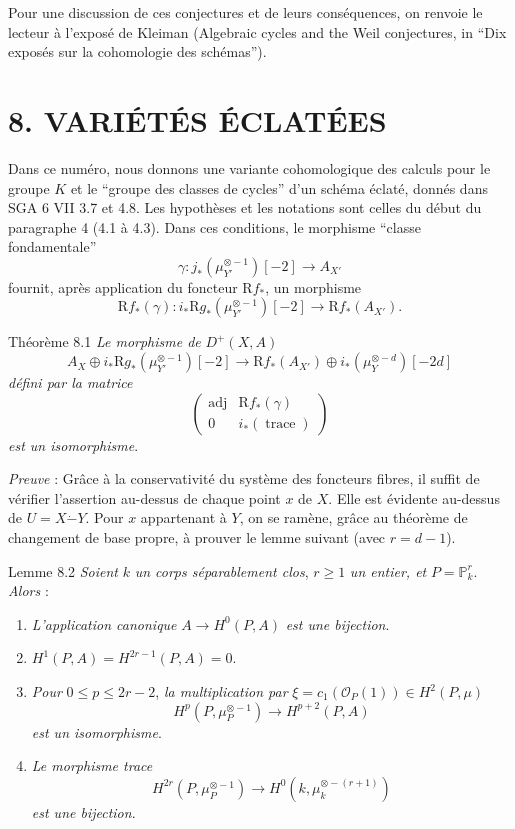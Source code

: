 Pour une discussion de ces conjectures et de leurs conséquences, on renvoie le lecteur à l'exposé de Kleiman (Algebraic cycles and the Weil conjectures, in ``Dix exposés sur la cohomologie des schémas'').

\section*{8. VARIÉTÉS ÉCLATÉES}

Dans ce numéro, nous donnons une variante cohomologique des calculs pour le groupe $K$ et le ``groupe des classes de cycles'' d'un schéma éclaté, donnés dans SGA 6 VII 3.7 et 4.8. Les hypothèses et les notations sont celles du début du paragraphe 4 (4.1 à 4.3). Dans ces conditions, le morphisme ``classe fondamentale''
\[
\gamma:j_*(\mu_{Y'}^{\otimes -1})[-2]\to A_{X'}
\]
fournit, après application du foncteur $\mathrm{R} f_*$, un morphisme
\[
\mathrm{R} f_*(\gamma):i_*\mathrm{R} g_*(\mu_{Y'}^{\otimes -1})[-2]\to \mathrm{R} f_*(A_{X'}).
\]

\begin{statement}{Théorème 8.1}
\emph{Le morphisme de} $D^+(X,A)$
\[
A_X\oplus i_*\mathrm{R} g_*(\mu_{Y'}^{\otimes -1})[-2]\to
\mathrm{R} f_*(A_{X'})\oplus i_*(\mu_Y^{\otimes -d})[-2d]
\tag{8.1.1}
\]
\emph{défini par la matrice}
\[
\begin{pmatrix}
\operatorname{adj}&\mathrm{R} f_*(\gamma)\\
0&i_*(\operatorname{trace})
\end{pmatrix}
\]
\emph{est un isomorphisme}.
\end{statement}

\emph{Preuve} : Grâce à la conservativité du système des foncteurs fibres, il suffit de vérifier l'assertion au-dessus de chaque point $x$ de $X$. Elle est évidente au-dessus de $U=X\mathbin{\dot{-}}Y$. Pour $x$ appartenant à $Y$, on se ramène, grâce au théorème de changement de base propre, à prouver le lemme suivant (avec $r=d-1$).

\begin{statement}{Lemme 8.2}
\emph{Soient} $k$ \emph{un corps séparablement clos}, $r\ge1$ \emph{un entier, et} $P=\mathbb{P}_k^r$. \emph{Alors} :
\begin{enumerate}[label=\alph*)]
\item \emph{L'application canonique} $A\to H^0(P,A)$ \emph{est une bijection}.
\item $H^1(P,A)=H^{2r-1}(P,A)=0$.
\item
\emph{Pour} $0\le p\le2r-2$, \emph{la multiplication par} $\xi=c_1(\mathcal{O}_P(1))\in H^2(P,\mu)$
\[
H^p(P,\mu_P^{\otimes -1})\to H^{p+2}(P,A)
\]
\emph{est un isomorphisme}.
\item \emph{Le morphisme trace}
\[
H^{2r}(P,\mu_P^{\otimes -1})\to H^0(k,\mu_k^{\otimes -(r+1)})
\]
\emph{est une bijection}.
\end{enumerate}
\end{statement}


